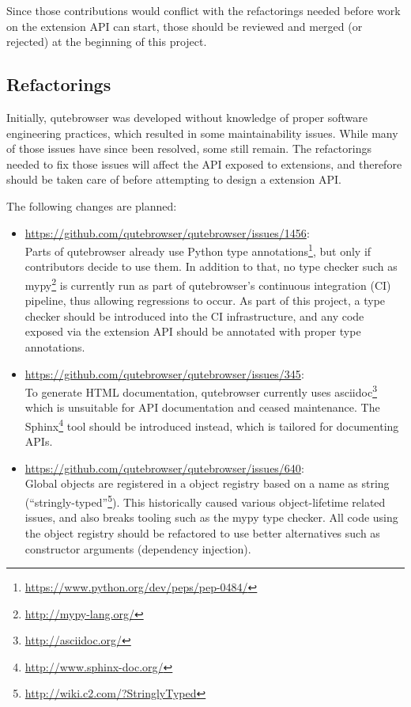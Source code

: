 Since those contributions would conflict with the refactorings needed before
work on the extension API can start, those should be reviewed and merged (or
rejected) at the beginning of this project.

\subsection{Refactorings}
\label{sec:goals-refactorings}

Initially, qutebrowser was developed without knowledge of proper software
engineering practices, which resulted in some maintainability issues. While many
of those issues have since been resolved, some still remain. The refactorings
needed to fix those issues will affect the API exposed to extensions, and
therefore should be taken care of before attempting to design a extension API.

The following changes are planned:

\begin{itemize}
  \item \url{https://github.com/qutebrowser/qutebrowser/issues/1456}: \\
    Parts of qutebrowser already use Python type
    annotations\footnote{\url{https://www.python.org/dev/peps/pep-0484/}}, but
    only if contributors decide to use them. In addition to that, no type
    checker such as mypy\footnote{\url{http://mypy-lang.org/}} is currently run
    as part of qutebrowser's continuous integration (CI) pipeline, thus allowing
    regressions to occur. As part of this project, a type checker should be
    introduced into the CI infrastructure, and any code exposed via the extension
    API should be annotated with proper type annotations.
  \item \url{https://github.com/qutebrowser/qutebrowser/issues/345}: \\
    To generate HTML documentation, qutebrowser currently uses
    asciidoc\footnote{\url{http://asciidoc.org/}} which is unsuitable for API
    documentation and ceased maintenance. The
    Sphinx\footnote{\url{http://www.sphinx-doc.org/}} tool should be
    introduced instead, which is tailored for documenting APIs.
  \item \url{https://github.com/qutebrowser/qutebrowser/issues/640}: \\
    Global objects are registered in a object registry based on a name as
    string (``stringly-typed''\footnote{\url{http://wiki.c2.com/?StringlyTyped}}).
    This historically caused various object-lifetime related issues, and also
breaks tooling such as the mypy type checker. All code using the object registry
should be refactored to use better alternatives such as constructor arguments
(dependency injection).
\end{itemize}

